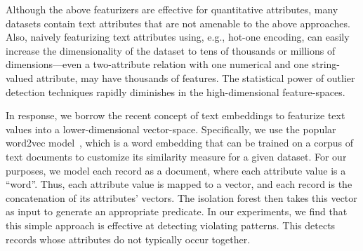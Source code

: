 Although the above featurizers are effective for quantitative attributes, many datasets contain text attributes that are not amenable to the above approaches.  Also, naively featurizing text attributes using, e.g., hot-one encoding, can easily increase the dimensionality of the dataset to tens of thousands or millions of dimensions---even a two-attribute relation with one numerical and one string-valued attribute, may have thousands of features.  The statistical power of outlier detection techniques rapidly diminishes in the high-dimensional feature-spaces.

In response, we borrow the recent concept of text embeddings to featurize text values into a lower-dimensional vector-space.  Specifically, we use the popular \textsf{word2vec} model~\cite{mikolov2013distributed}, which is a word embedding that can be trained on a corpus of text documents to customize its similarity measure for a given dataset.  For our purposes, we model each record as a document, where each attribute value is a ``word''.  Thus, each attribute value is mapped to a vector, and each record is the concatenation of its attributes' vectors.  The isolation forest then takes this vector as input to generate an appropriate predicate.  In our experiments, we find that this simple approach is effective at detecting violating patterns. This detects records whose attributes do not typically occur together. 


 













